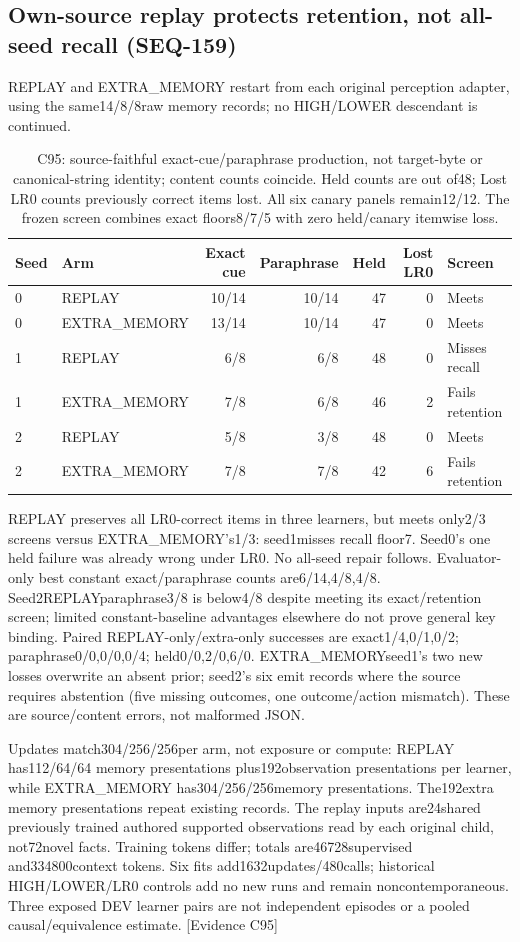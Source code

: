\documentclass[11pt]{article}
\newcommand{\ev}[1]{\textsf{[Evidence #1]}}
\begin{document}
\subsection{Own-source replay protects retention, not all-seed recall (SEQ-159)}
\label{sec:seq159-replay}
REPLAY and EXTRA\_MEMORY restart from each original perception adapter, using
the same14/8/8raw memory records; no HIGH/LOWER descendant is continued.
\begin{table}[htbp]
\centering\small
\begin{tabular}{llrrrrl}
\toprule
Seed & Arm & Exact cue & Paraphrase & Held & Lost LR0 & Screen \\
\midrule
0 & REPLAY & 10/14 & 10/14 & 47 & 0 & Meets \\
0 & EXTRA\_MEMORY & 13/14 & 10/14 & 47 & 0 & Meets \\
1 & REPLAY & 6/8 & 6/8 & 48 & 0 & Misses recall \\
1 & EXTRA\_MEMORY & 7/8 & 6/8 & 46 & 2 & Fails retention \\
2 & REPLAY & 5/8 & 3/8 & 48 & 0 & Meets \\
2 & EXTRA\_MEMORY & 7/8 & 7/8 & 42 & 6 & Fails retention \\
\bottomrule
\end{tabular}
\caption{C95: source-faithful exact-cue/paraphrase production, not target-byte
or canonical-string identity; content counts coincide. Held counts are out of48;
Lost LR0 counts previously correct items lost. All six canary panels remain12/12.
The frozen screen combines exact floors8/7/5 with zero held/canary itemwise loss.}
\label{tab:seq159-replay}
\end{table}
REPLAY preserves all LR0-correct items in three learners, but meets only2/3
screens versus EXTRA\_MEMORY's1/3: seed1misses recall floor7. Seed0's one held
failure was already wrong under LR0. No all-seed repair follows. Evaluator-only
best constant exact/paraphrase counts are6/14,4/8,4/8. Seed2REPLAYparaphrase3/8
is below4/8 despite meeting its exact/retention screen; limited constant-baseline
advantages elsewhere do not prove general key binding. Paired REPLAY-only/extra-only
successes are exact1/4,0/1,0/2; paraphrase0/0,0/0,0/4; held0/0,2/0,6/0.
EXTRA\_MEMORYseed1's two new losses overwrite an absent prior; seed2's six
emit records where the source requires abstention (five missing outcomes, one
outcome/action mismatch). These are source/content errors, not malformed JSON.

Updates match304/256/256per arm, not exposure or compute: REPLAY has112/64/64
memory presentations plus192observation presentations per learner, while
EXTRA\_MEMORY has304/256/256memory presentations. The192extra memory
presentations repeat existing records. The replay inputs are24shared previously
trained authored supported observations read by each original child, not72novel
facts. Training tokens differ; totals are46728supervised and334800context tokens.
Six fits add1632updates/480calls; historical HIGH/LOWER/LR0 controls add no new
runs and remain noncontemporaneous. Three exposed DEV learner pairs are not
independent episodes or a pooled causal/equivalence estimate. \ev{C95}
\end{document}
